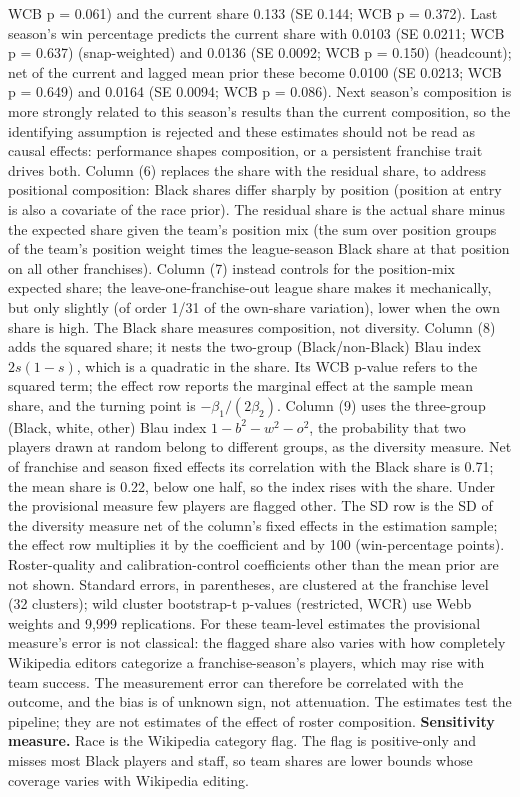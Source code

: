 \begin{table}[!h]
{\begin{threeparttable}
\begin{tablenotes}[para]
WCB p = 0.061) and the current share 0.133 (SE 0.144; WCB p = 0.372). Last season's win percentage predicts the current share with 0.0103 (SE 0.0211; WCB p = 0.637) (snap-weighted) and 0.0136 (SE 0.0092; WCB p = 0.150) (headcount); net of the current and lagged mean prior these become 0.0100 (SE 0.0213; WCB p = 0.649) and 0.0164 (SE 0.0094; WCB p = 0.086). Next season's composition is more strongly related to this season's results than the current composition, so the identifying assumption is rejected and these estimates should not be read as causal effects: performance shapes composition, or a persistent franchise trait drives both. Column (6) replaces the share with the residual share, to address positional composition: Black shares differ sharply by position (position at entry is also a covariate of the race prior). The residual share is the actual share minus the expected share given the team's position mix (the sum over position groups of the team's position weight times the league-season Black share at that position on all other franchises). Column (7) instead controls for the position-mix expected share; the leave-one-franchise-out league share makes it mechanically, but only slightly (of order 1/31 of the own-share variation), lower when the own share is high. The Black share measures composition, not diversity. Column (8) adds the squared share; it nests the two-group (Black/non-Black) Blau index $2s(1-s)$, which is a quadratic in the share. Its WCB p-value refers to the squared term; the effect row reports the marginal effect at the sample mean share, and the turning point is $-\beta_1/(2\beta_2)$. Column (9) uses the three-group (Black, white, other) Blau index $1 - b^2 - w^2 - o^2$, the probability that two players drawn at random belong to different groups, as the diversity measure. Net of franchise and season fixed effects its correlation with the Black share is 0.71; the mean share is 0.22, below one half, so the index rises with the share. Under the provisional measure few players are flagged other. The SD row is the SD of the diversity measure net of the column's fixed effects in the estimation sample; the effect row multiplies it by the coefficient and by 100 (win-percentage points). Roster-quality and calibration-control coefficients other than the mean prior are not shown. Standard errors, in parentheses, are clustered at the franchise level (32 clusters); wild cluster bootstrap-t p-values (restricted, WCR) use Webb weights and 9,999 replications. For these team-level estimates the provisional measure's error is not classical: the flagged share also varies with how completely Wikipedia editors categorize a franchise-season's players, which may rise with team success. The measurement error can therefore be correlated with the outcome, and the bias is of unknown sign, not attenuation. The estimates test the pipeline; they are not estimates of the effect of roster composition. \textbf{Sensitivity measure.} Race is the Wikipedia category flag. The flag is positive-only and misses most Black players and staff, so team shares are lower bounds whose coverage varies with Wikipedia editing.
\end{tablenotes}
\end{threeparttable}}
\end{table}

